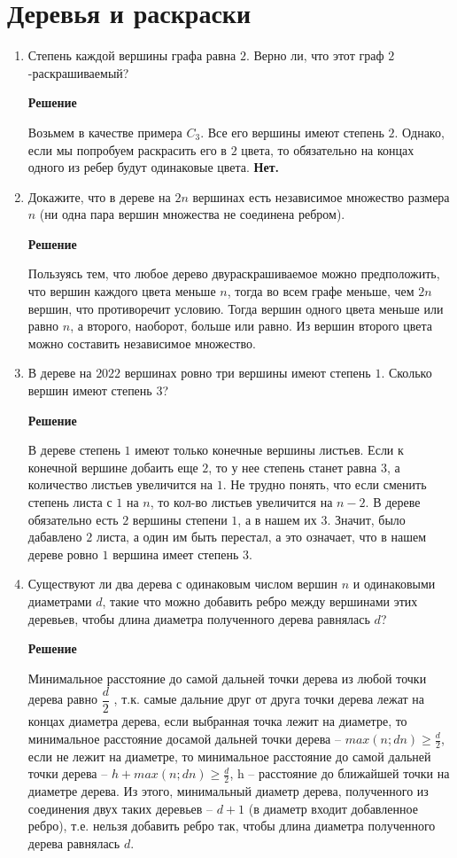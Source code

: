 \documentclass[12pt]{article}
\begin{document}
	\section{Деревья и раскраски}
	\begin{enumerate}[label={\textbf{\arabic{section}.\arabic*}}]
		\item Степень каждой вершины графа равна $2$. Верно ли, что этот граф $2$-раскрашиваемый?

		
		\textbf{Решение}
		
		Возьмем в качестве примера $C_3$. Все его вершины имеют степень $2$. Однако, если мы попробуем раскрасить его в $2$ цвета, то обязательно на концах одного из ребер будут одинаковые цвета. \textbf{Нет.}
		
		\item Докажите, что в дереве на $2n$ вершинах есть независимое множество размера $n$ (ни одна пара вершин множества не соединена ребром).

		
		\textbf{Решение}
		
		Пользуясь тем, что любое дерево двураскрашиваемое можно предположить, что вершин каждого цвета меньше $n$, тогда во всем графе меньше, чем $2n$ вершин, что противоречит условию. Тогда вершин одного цвета меньше или равно $n$, а второго, наоборот, больше или равно. Из вершин второго цвета можно составить независимое множество.
		
		\item В дереве на $2022$ вершинах ровно три вершины имеют степень $1$. Сколько вершин имеют степень $3$?
		
		\textbf{Решение}
		
		В дереве степень $1$ имеют только конечные вершины листьев. Если
		к конечной вершине добаить еще $2$, то у нее степень станет равна $3$, а количество листьев увеличится на $1$. Не трудно понять, что если сменить степень листа с $1$ на $n$, то кол-во листьев увеличится на $n-2$. В дереве обязательно есть $2$ вершины степени $1$, а в нашем их $3$. Значит, было дабавлено $2$ листа, а один им быть перестал, а это означает, что в нашем дереве ровно $1$ вершина имеет степень $3$.
		
		\item Существуют ли два дерева с одинаковым числом вершин $n$ и одинаковыми диаметрами $d$, такие что можно добавить ребро между вершинами этих деревьев, чтобы длина диаметра полученного дерева равнялась $d$?
		
		\textbf{Решение}
		
		Минимальное расстояние до самой дальней точки дерева из любой
		точки дерева равно $\dfrac{d}{2}$ , т.к. самые дальние друг от друга точки дерева лежат на концах диаметра дерева, если выбранная точка лежит на диаметре, то минимальное расстояние досамой дальней точки дерева – $max(n; dn) \geq \frac{d}{2}$, если не лежит на диаметре, то минимальное расстояние до самой дальней точки дерева – $h + max(n; dn) \geq \frac{d}{2}$, h – расстояние до ближайшей точки на диаметре дерева. Из этого, минимальный диаметр дерева, полученного из соединения двух таких деревьев -- $d + 1$ (в диаметр входит добавленное ребро), т.е. нельзя добавить ребро так, чтобы длина диаметра полученного дерева равнялась $d$.
		

\end{enumerate}
\end{document}
